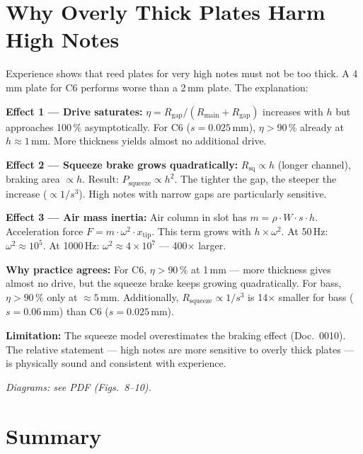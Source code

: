 \documentclass[11pt,a4paper]{article}
\begin{document}
\section{Why Overly Thick Plates Harm High Notes}

Experience shows that reed plates for very high notes must not be too thick. A 4\,mm plate for C6 performs worse than a 2\,mm plate. The explanation:

\textbf{Effect 1 --- Drive saturates:} $\eta = R_\text{gap}/(R_\text{main} + R_\text{gap})$ increases with $h$ but approaches 100\,\% asymptotically. For C6 ($s = 0{.}025$\,mm), $\eta > 90\,\%$ already at $h \approx 1$\,mm. More thickness yields almost no additional drive.

\textbf{Effect 2 --- Squeeze brake grows quadratically:} $R_\text{sq} \propto h$ (longer channel), braking area $\propto h$. Result: $P_\text{squeeze} \propto h^2$. The tighter the gap, the steeper the increase ($\propto 1/s^3$). High notes with narrow gaps are particularly sensitive.

\textbf{Effect 3 --- Air mass inertia:} Air column in slot has $m = \rho \cdot W \cdot s \cdot h$. Acceleration force $F = m \cdot \omega^2 \cdot x_\text{tip}$. This term grows with $h \times \omega^2$. At 50\,Hz: $\omega^2 \approx 10^5$. At 1000\,Hz: $\omega^2 \approx 4 \times 10^7$ --- 400$\times$ larger.

\begin{keybox}
\textbf{Why practice agrees:} For C6, $\eta > 90\,\%$ at 1\,mm --- more thickness gives almost no drive, but the squeeze brake keeps growing quadratically. For bass, $\eta > 90\,\%$ only at $\approx 5$\,mm. Additionally, $R_\text{squeeze} \propto 1/s^3$ is 14$\times$ smaller for bass ($s = 0{.}06$\,mm) than C6 ($s = 0{.}025$\,mm).
\end{keybox}

\begin{warnbox}
\textbf{Limitation:} The squeeze model overestimates the braking effect (Doc.~0010). The relative statement --- high notes are more sensitive to overly thick plates --- is physically sound and consistent with experience.
\end{warnbox}

\textit{Diagrams: see PDF (Figs.~8--10).}

\section{Summary}
\end{document}

